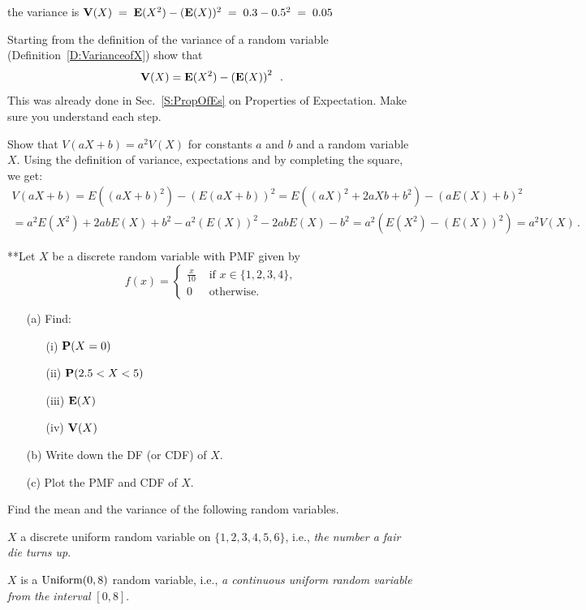 \begin{ExerciseList}
\ba{\e(X^2)&=\int^1_0 6x(1-x)x^2\,dx\\[3pt]
&=\;\int^1_0 6x^3-6x^4\,dx\\[3pt]
&=\;\left.\frac{6}{4}x^4-\frac{6}{5}x^5\right]^1_0\\
&=\;\frac{6}{4}(1^4-0)-\frac{6}{5}(1^5-0)\\
&=0.3  
}
the variance is $\mathbf{V}(X)\;=\;\mathbf{E}(X^2)-(\mathbf{E}(X))^2\;=\;0.3-0.5^2\;=\;0.05$

\Exercise
Starting from the definition of the variance of a random variable (Definition~\ref{D:VarianceofX}) show that
\[\mathbf{V}(X) = \mathbf{E}(X^2) - \left(\mathbf{E}(X)\right)^2 \enspace .\]
\Answer
This was already done in Sec.~\ref{S:PropOfEs} on Properties of Expectation. Make sure you understand each step.

\Exercise
Show that $V(aX+b) = a^2 V(X)$ for constants $a$ and $b$ and a random variable $X$.
\Answer
Using the definition of variance, expectations and by completing the square, we get:
\begin{multline*}
V(aX+b) = E ((aX+b)^2) - (E(aX+b))^2 = E \left( (aX)^2 + 2aXb + b^2 \right) - \left( aE(X)+b\right)^2 \\
= a^2 E \left(X^2\right) + 2ab E(X) + b^2 - a^2(E(X))^2 - 2abE(X) - b^2
= a^2 \left( E \left(X^2\right) - (E(X))^2 \right) = a^2 V(X) \, .
\end{multline*}

\Exercise
{**}Let $X$ be a discrete random variable with PMF given by
\[
f(x) = 
\begin{cases}
\frac{x}{10} & \text{ if } x \in \{1,2,3,4\} ,\\
0 & \text{ otherwise.}
\end{cases}
\]
\begin{itemize}
\item[(a)] Find:
\begin{itemize}
\item[(i)] $\mathbf{P}(X=0)$
\item[(ii)] $\mathbf{P}(2.5 < X < 5)$
\item[(iii)] $\mathbf{E}(X)$
\item[(iv)] $\mathbf{V}(X)$
\end{itemize}
\item[(b)] Write down the DF (or CDF) of $X$.
\item[(c)] Plot the PMF and CDF of $X$.
\end{itemize}

\Exercise
Find the mean and the variance of the following  random variables.
\be
\item $X$ a discrete uniform random variable on $\{1,2,3,4,5,6\}$, i.e., \textit{the number a fair die turns up}.
 \item $X$ is a $\mbox{{\rm Uniform}}(0,8)$ random variable, i.e., \textit{a continuous uniform random variable from the interval} $[0,8]$.


\end{ExerciseList}
